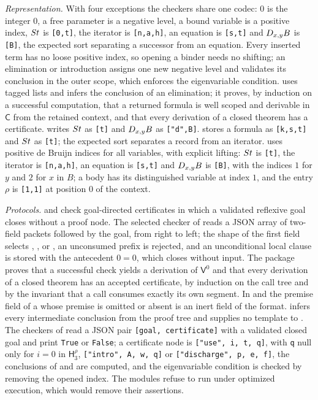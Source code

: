 \emph{Representation.} With four exceptions the checkers share one
codec:
$0$ is the integer $0$, a free parameter is a negative level, a bound
variable is a positive index, $S t$ is \texttt{[0,t]}, the iterator is
\texttt{[n,a,h]}, an equation is \texttt{[s,t]} and $D_{x,y}B$ is
\texttt{[B]}, the expected sort separating a successor from an equation.
Every inserted term has no loose positive index, so opening a binder needs
no shifting; an elimination or introduction assigns one new negative level
and validates its conclusion in the outer scope, which enforces the
eigenvariable condition.  uses tagged lists and
infers the conclusion of an elimination; it proves, by induction on a
successful computation, that a returned formula is well scoped and
derivable in $\mathsf{C}$ from the retained context, and that every
derivation of a closed theorem has a certificate. 
writes $S t$ as \texttt{[t]} and $D_{x,y}B$ as \texttt{["d",B]}.
 stores a formula as \texttt{[k,s,t]} and $S t$ as
\texttt{[t]}; the expected sort separates a record from an iterator.
 uses positive de Bruijn indices for all
variables, with explicit lifting: $S t$ is \texttt{[t]}, the iterator
is \texttt{[n,a,h]}, an equation is \texttt{[s,t]} and $D_{x,y}B$ is
\texttt{[B]}, with the indices $1$ for $y$ and $2$ for $x$ in $B$; a body
has its distinguished variable at index $1$, and the entry $\rho$ is
\texttt{[1,1]} at position $0$ of the context.

\emph{Protocols.}  and
 check goal-directed certificates in which a
validated reflexive goal closes without a proof node. The selected
checker of  reads a JSON array of two-field packets
followed by the goal, from right to left; the shape of the first field
selects , ,  or
, an unconsumed prefix is rejected, and an unconditional
local clause is stored with the antecedent $0=0$, which closes without
input. The package proves that a successful check yields a derivation of
$\mathsf{V}^{0}$ and that every derivation of a closed theorem has an
accepted certificate, by induction on the call tree and by the invariant
that a call consumes exactly its own segment. In 
and  the premise field of a 
whose premise is omitted or absent is an inert field of the format.
 infers every intermediate conclusion from the
proof tree and supplies no template to . The checkers
of  read a JSON pair \texttt{[goal,
certificate]} with a validated closed goal and print \texttt{True} or
\texttt{False}; a certificate node is \texttt{["use", i, t, q]}, with
\texttt{q} null only for $i=0$ in $\mathsf{H}_3^{\rho}$,
\texttt{["intro", A, w, q]} or \texttt{["discharge", p, e, f]}, the
conclusions of  and  are computed, and
the eigenvariable condition is checked by removing the opened index. The
modules refuse to run under optimized execution, which would remove their
assertions.

